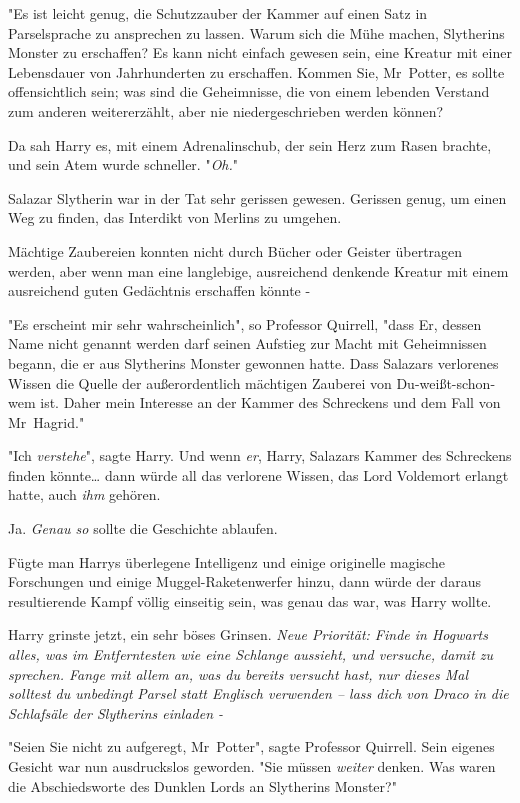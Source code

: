 {"Es ist leicht genug, die Schutzzauber der Kammer auf einen Satz in Parselsprache zu ansprechen zu lassen. Warum sich die Mühe machen, Slytherins Monster zu erschaffen? Es kann nicht einfach gewesen sein, eine Kreatur mit einer Lebensdauer von Jahrhunderten zu erschaffen. Kommen Sie, Mr~Potter, es sollte offensichtlich sein; was sind die Geheimnisse, die von einem lebenden Verstand zum anderen weitererzählt, aber nie niedergeschrieben werden können?

Da sah Harry es, mit einem Adrenalinschub, der sein Herz zum Rasen brachte, und sein Atem wurde schneller. "\emph{Oh.}"

Salazar Slytherin war in der Tat sehr gerissen gewesen. Gerissen genug, um einen Weg zu finden, das Interdikt von Merlins zu umgehen.

Mächtige Zaubereien konnten nicht durch Bücher oder Geister übertragen werden, aber wenn man eine langlebige, ausreichend denkende Kreatur mit einem ausreichend guten Gedächtnis erschaffen könnte -

"Es erscheint mir sehr wahrscheinlich", so Professor Quirrell, "dass Er, dessen Name nicht genannt werden darf seinen Aufstieg zur Macht mit Geheimnissen begann, die er aus Slytherins Monster gewonnen hatte. Dass Salazars verlorenes Wissen die Quelle der außerordentlich mächtigen Zauberei von Du-weißt-schon-wem ist. Daher mein Interesse an der Kammer des Schreckens und dem Fall von Mr~Hagrid."

"Ich \emph{verstehe}", sagte Harry. Und wenn \emph{er}, Harry, Salazars Kammer des Schreckens finden könnte… dann würde all das verlorene Wissen, das Lord Voldemort erlangt hatte, auch \emph{ihm} gehören.

Ja. \emph{Genau so} sollte die Geschichte ablaufen.

Fügte man Harrys überlegene Intelligenz und einige originelle magische Forschungen und einige Muggel-Raketenwerfer hinzu, dann würde der daraus resultierende Kampf völlig einseitig sein, was genau das war, was Harry wollte.

Harry grinste jetzt, ein sehr böses Grinsen. \emph{Neue Priorität: Finde in Hogwarts alles, was im Entferntesten wie eine Schlange aussieht, und versuche, damit zu sprechen. Fange mit allem an, was du bereits versucht hast, nur dieses Mal solltest du unbedingt} \emph{Parsel} \emph{statt Englisch verwenden -- lass dich von Draco in die Schlafsäle der Slytherins einladen -}

"Seien Sie nicht zu aufgeregt, Mr~Potter", sagte Professor Quirrell. Sein eigenes Gesicht war nun ausdruckslos geworden. "Sie müssen \emph{weiter} denken. Was waren die Abschiedsworte des Dunklen Lords an Slytherins Monster?"

}
